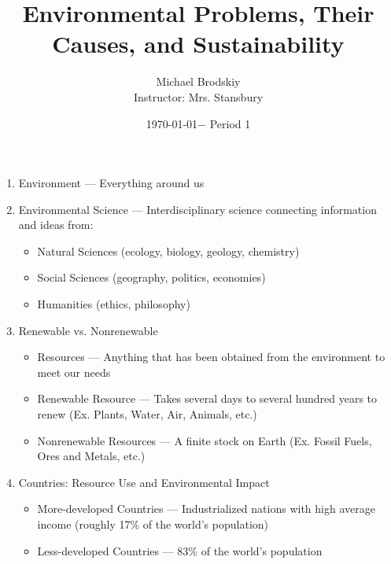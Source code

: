 \documentclass[12pt]{article}
\title{Environmental Problems, Their Causes, and Sustainability}
\date{\today $-$ Period 1}
\author{Michael Brodskiy\\ \small Instructor: Mrs. Stansbury}
\begin{document}
\maketitle

\begin{enumerate}

  \item Environment — Everything around us

  \item Environmental Science — Interdisciplinary science connecting information and ideas from:

    \begin{itemize}

      \item Natural Sciences (ecology, biology, geology, chemistry)

      \item Social Sciences (geography, politics, economies)

      \item Humanities (ethics, philosophy)

    \end{itemize}

  \item Renewable vs. Nonrenewable

    \begin{itemize}

      \item Resources — Anything that has been obtained from the environment to meet our needs

      \item Renewable Resource — Takes several days to several hundred years to renew (Ex. Plants, Water, Air, Animals, etc.)

      \item Nonrenewable Resources — A finite stock on Earth (Ex. Fossil Fuels, Ores and Metals, etc.)

    \end{itemize}

  \item Countries: Resource Use and Environmental Impact

    \begin{itemize}

      \item More-developed Countries — Industrialized nations with high average income (roughly 17\% of the world's population)

      \item Less-developed Countries — 83\% of the world's population


\end{itemize}
\end{enumerate}
\end{document}
